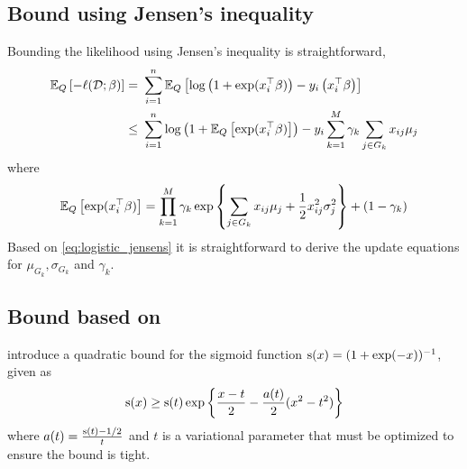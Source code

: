 \documentclass[12pt]{article}
\begin{document}
\subsection*{Bound using Jensen's inequality}

Bounding the likelihood using Jensen's inequality is straightforward,
\begin{align}
    \E_Q \left[ - \ell(\D; \beta) \right]
    =&\ 
	\sum_{i=1}^n  \E_Q \left[
	    \log \left(1 + \exp(x_i^\top \beta) \right) 
	    -
	    y_i \left( x_i^\top \beta \right) 
	\right] 
    \nonumber \\
    \leq &\ 
	\sum_{i=1}^n  
	    \log \left(1 + \E_Q \left[ \exp(x_i^\top \beta) \right] \right) 
	    -
	    y_i \sum_{k=1}^M \gamma_k \sum_{j \in G_k} x_{ij} \mu_{j}
    \label{eq:logistic_jensens}
\end{align}
where
\begin{equation*}
    \mathbb{E}_Q \left[ \exp(x_i^\top \beta) \right]
    =	
	\prod_{k=1}^M \gamma_k \exp \left\{ 
	    \sum_{j \in G_k} 
	    x_{ij} \mu_{j}
	    + 
	    \frac{1}{2} x_{ij}^2 \sigma_{j}^2
	\right\}
	+
	(1- \gamma_k)
\end{equation*}
Based on \eqref{eq:logistic_jensens} it is straightforward to derive the update equations for $\mu_{G_k}, \sigma_{G_k}$ and $\gamma_k$.


\subsection*{Bound based on \cite{Jakkola97}}

\cite{Jakkola97} introduce a quadratic bound for the sigmoid function $\text{s}(x) = (1 + \exp(-x))^{-1}$, given as
\begin{equation} \label{eq:jj_bound}
    \text{s}(x) 
    \geq 
	\text{s}(t)
	\exp \left\{
	    \frac{x-t}{2}
	    -
	    \frac{a(t)}{2} (x^2 - t^2)
	\right\}
\end{equation}
where $a(t) = \frac{\text{s} (t) - 1/2}{t}$ and $t$ is a variational parameter that must be optimized to ensure the bound is tight.
\end{document}
